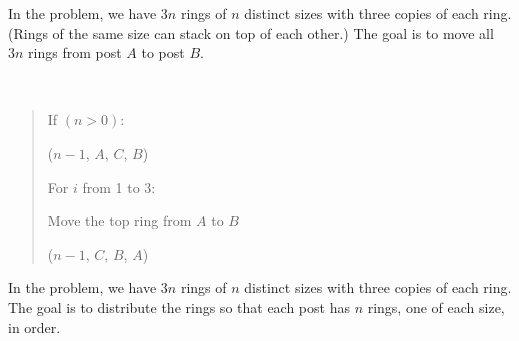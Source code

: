 \documentclass[10pt]{article}
\begin{document}
\pagebreak

In the  problem, we have $ 3n $ rings of $ n $ distinct sizes with three copies of each ring. (Rings of the same size can stack on top of each other.) The goal is to move all $ 3n $ rings from post $ A $ to post $ B $.

\begin{solution}\ %
\begin{quote}
\noindent{}%

%

\begin{steps}
  \item If $ (n > 0) $:
  \begin{steps}
    \item {}($n-1$, $ A $, $C$, $ B $)

    \item For $i$ from 1 to 3:
    \begin{steps}
      \item Move the top ring from $ A $ to $ B $
    \end{steps}
    \item {}($n-1$, $ C $, $ B $, $ A $)
  \end{steps}
\end{steps}
\end{quote}
\end{solution}
\pagebreak

In the  problem, we have $ 3n $ rings of $ n $ distinct sizes with three copies of each ring. The goal is to distribute the rings so that each post has $ n $ rings, one of each size, in order.
\end{document}
